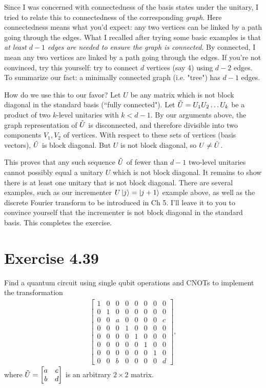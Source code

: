 \documentclass{book}
\begin{document}
    Since I was concerned with connectedness of the basis states under the unitary, I tried to relate this to connectedness of the corresponding \emph{graph}. Here connectedness means what you'd expect: any two vertices can be linked by a path going through the edges. What I recalled after trying some basic examples is that \emph{at least $d-1$ edges are needed to ensure the graph is connected}. By connected, I mean any two vertices are linked by a path going through the edges. If you're not convinced, try this yourself: try to connect $d$ vertices (say 4) using $d-2$ edges. To summarize our fact: a minimally connected graph (i.e. "tree") has $d-1$ edges. 

    How do we use this to our favor? Let $U$ be any matrix which is not block diagonal in the standard basis (``fully connected"). Let $\Tilde{U} = U_1 U_2 \dots U_k$ be a product of two $k$-level unitaries with $k < d-1$. By our arguments above, the graph representation of $\Tilde{U}$ is disconnected, and therefore divisible into two components $V_1, V_2$ of vertices. With respect to these sets of vertices (basis vectors), $\Tilde{U}$ is block diagonal. But $U$ is not block diagonal, so $U \neq \Tilde{U}$. 

    This proves that any such sequence $\Tilde{U}$ of fewer than $d-1$ two-level unitaries cannot possibly equal a unitary $U$ which is not block diagonal. It remains to show there is at least one unitary that is not block diagonal. There are several examples, such as our incrementer $U\ket{j} = \ket{j+1}$ example above, as well as the discrete Fourier transform to be introduced in Ch 5. I'll leave it to you to convince yourself that the incrementer is not block diagonal in the standard basis. This completes the exercise.

\section*{Exercise 4.39}
    Find a quantum circuit using single qubit operations and CNOTs to implement the transformation
    \begin{align}
        \begin{bmatrix}
            1 & 0 & 0 & 0 & 0 & 0 & 0 & 0 \\ 
            0 & 1 & 0 & 0 & 0 & 0 & 0 & 0 \\ 
            0 & 0 & a & 0 & 0 & 0 & 0 & c \\ 
            0 & 0 & 0 & 1 & 0 & 0 & 0 & 0 \\ 
            0 & 0 & 0 & 0 & 1 & 0 & 0 & 0 \\ 
            0 & 0 & 0 & 0 & 0 & 1 & 0 & 0 \\ 
            0 & 0 & 0 & 0 & 0 & 0 & 1 & 0 \\ 
            0 & 0 & b & 0 & 0 & 0 & 0 & d  
        \end{bmatrix},
    \end{align}
    where $\Tilde{U} = \begin{bmatrix}
        a & c \\
        b & d
    \end{bmatrix}$ is an arbitrary $2\times 2$ matrix.
\end{document}
